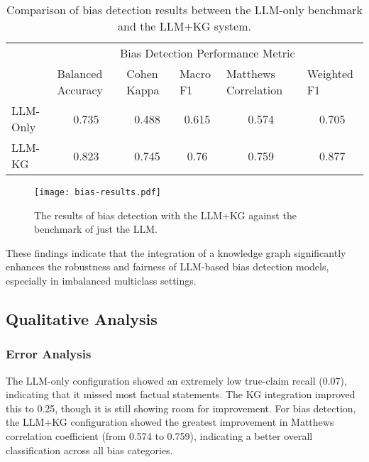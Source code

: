\documentclass[11pt]{article}
\begin{document}
\begin{table}[H]
\begin{tabular}{@{}lccccc@{}}
\toprule
         & \multicolumn{5}{c}{Bias Detection Performance Metric}                                                                                                                                                \\
         & \multicolumn{1}{l}{Balanced   Accuracy} & \multicolumn{1}{l}{Cohen Kappa} & \multicolumn{1}{l}{Macro F1} & \multicolumn{1}{l}{Matthews Correlation} & \multicolumn{1}{l}{Weighted F1} \\ \midrule
LLM-Only & 0.735                                   & 0.488                           & 0.615                        & 0.574                                    & 0.705                           \\
LLM-KG   & 0.823                                   & 0.745                           & 0.76                         & 0.759                                    & 0.877                           \\ \bottomrule
\end{tabular}
\caption{Comparison of bias detection results between the LLM-only benchmark and the LLM+KG system.}
\label{tab:my_table}
\end{table}


\begin{figure}[H]
\begin{center}
\texttt{[image: bias-results.pdf]}
\end{center}
\caption{The results of bias detection with the LLM+KG against the benchmark of just the LLM.}
\label{fig:bias-results}
\end{figure}
These findings indicate that the integration of a knowledge graph significantly enhances the robustness and fairness of LLM-based bias detection models, especially in imbalanced multiclass settings. 


\subsection{Qualitative Analysis}

\subsubsection{Error Analysis}
The LLM-only configuration showed an extremely low true-claim recall (0.07), indicating that it missed most factual statements. The KG integration improved this to 0.25, though it is still showing room for improvement. For bias detection, the LLM+KG configuration showed the greatest improvement in Matthews correlation coefficient (from 0.574 to 0.759), indicating a better overall classification across all bias categories.
\end{document}
